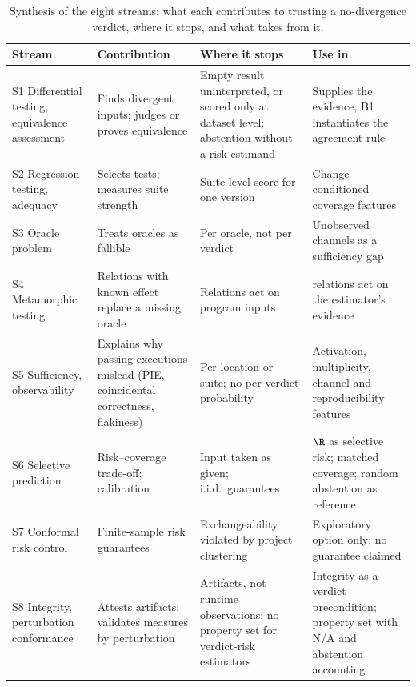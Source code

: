\begin{table}[!t]
\caption{Synthesis of the eight streams: what each contributes to trusting a no-divergence verdict, where it stops, and what \sbg{} takes from it.}
\label{tab:synthesis}
\centering
\footnotesize
\setlength{\tabcolsep}{3pt}
\renewcommand{\arraystretch}{1.08}
\begin{tabular}{|L{2.6cm}|L{4.3cm}|L{4.6cm}|L{4.9cm}|}
\hline
Stream & Contribution & Where it stops & Use in \sbg{} \\
\hline
S1 Differential testing, equivalence assessment & Finds divergent inputs; judges or proves equivalence & Empty result uninterpreted, or scored only at dataset level; abstention without a risk estimand & Supplies the evidence; B1 instantiates the agreement rule \\
S2 Regression testing, adequacy & Selects tests; measures suite strength & Suite-level score for one version & Change-conditioned coverage features \\
S3 Oracle problem & Treats oracles as fallible & Per oracle, not per verdict & Unobserved channels as a sufficiency gap \\
S4 Metamorphic testing & Relations with known effect replace a missing oracle & Relations act on program inputs & \ers{} relations act on the estimator's evidence \\
S5 Sufficiency, observability & Explains why passing executions mislead (PIE, coincidental correctness, flakiness) & Per location or suite; no per-verdict probability & Activation, multiplicity, channel and reproducibility features \\
S6 Selective prediction & Risk--coverage trade-off; calibration & Input taken as given; i.i.d.\ guarantees & $\R$ as selective risk; matched coverage; random abstention as reference \\
S7 Conformal risk control & Finite-sample risk guarantees & Exchangeability violated by project clustering & Exploratory option only; no guarantee claimed \\
S8 Integrity, perturbation conformance & Attests artifacts; validates measures by perturbation & Artifacts, not runtime observations; no property set for verdict-risk estimators & Integrity as a verdict precondition; \ers{} property set with N/A and abstention accounting \\
\hline
\end{tabular}
\end{table}

